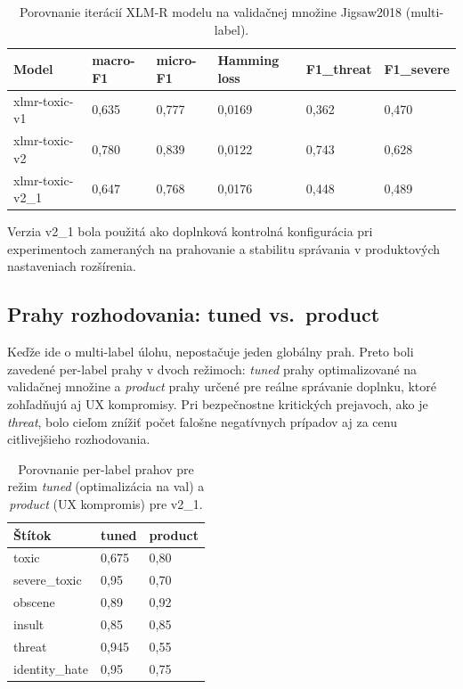 \FloatBarrier
\begin{table}[!htbp]
  \centering
  \small
  \label{tab:xlmr_versions_val}
  \begin{tabularx}{\textwidth}{|Y|Y|Y|Y|Y|Y|}
    \hline
    \textbf{Model} & \textbf{macro-F1} & \textbf{micro-F1} & \textbf{Hamming loss} & \textbf{F1\_threat} & \textbf{F1\_severe} \\
    \hline
    xlmr-toxic-v1 & 0{,}635 & 0{,}777 & 0{,}0169 & 0{,}362 & 0{,}470 \\
    \hline
    xlmr-toxic-v2 & 0{,}780 & 0{,}839 & 0{,}0122 & 0{,}743 & 0{,}628 \\
    \hline
    xlmr-toxic-v2\_1 & 0{,}647 & 0{,}768 & 0{,}0176 & 0{,}448 & 0{,}489 \\
    \hline
  \end{tabularx}
  \caption[Porovnanie verzií XLM-R]{Porovnanie iterácií XLM-R modelu na validačnej množine Jigsaw2018 (multi-label).}
\end{table}
\FloatBarrier

Verzia v2\_1 bola použitá ako doplnková kontrolná konfigurácia pri experimentoch zameraných na prahovanie a stabilitu správania v produktových nastaveniach rozšírenia.

\subsection{Prahy rozhodovania: tuned vs.\ product}
Keďže ide o multi-label úlohu, nepostačuje jeden globálny prah. Preto boli zavedené per-label prahy v dvoch režimoch: \emph{tuned} prahy optimalizované na validačnej množine a \emph{product} prahy určené pre reálne správanie doplnku, ktoré zohľadňujú aj UX kompromisy. Pri bezpečnostne kritických prejavoch, ako je \emph{threat}, bolo cieľom znížiť počet falošne negatívnych prípadov aj za cenu citlivejšieho rozhodovania.

\FloatBarrier
\begin{table}[!htbp]
  \centering
  \small
  \label{tab:thresholds_tuned_vs_product}
  \begin{tabularx}{\textwidth}{|Y|Y|Y|}
    \hline
    \textbf{Štítok} & \textbf{tuned} & \textbf{product} \\
    \hline
    toxic & 0{,}675 & 0{,}80 \\
    \hline
    severe\_toxic & 0{,}95 & 0{,}70 \\
    \hline
    obscene & 0{,}89 & 0{,}92 \\
    \hline
    insult & 0{,}85 & 0{,}85 \\
    \hline
    threat & 0{,}945 & 0{,}55 \\
    \hline
    identity\_hate & 0{,}95 & 0{,}75 \\
    \hline
  \end{tabularx}
  \caption[Prahy tuned vs product]{Porovnanie per-label prahov pre režim \emph{tuned} (optimalizácia na val) a \emph{product} (UX kompromis) pre v2\_1.}
\end{table}
\FloatBarrier

